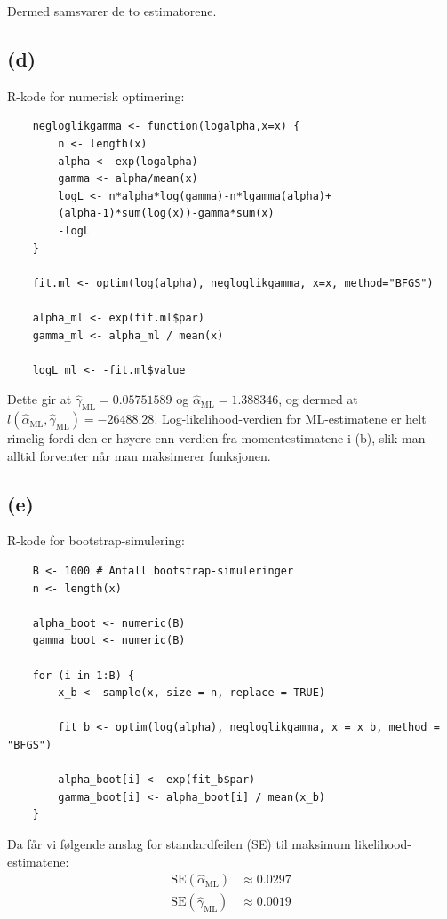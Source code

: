 \documentclass[11pt, a4paper]{article}
\begin{document}
Dermed samsvarer de to estimatorene.


\subsection*{(d)}
R-kode for numerisk optimering:
\vspace{0.5cm}
\begin{verbatim}
    negloglikgamma <- function(logalpha,x=x) {
        n <- length(x)
        alpha <- exp(logalpha)
        gamma <- alpha/mean(x)
        logL <- n*alpha*log(gamma)-n*lgamma(alpha)+
        (alpha-1)*sum(log(x))-gamma*sum(x)
        -logL
    }

    fit.ml <- optim(log(alpha), negloglikgamma, x=x, method="BFGS")

    alpha_ml <- exp(fit.ml$par)
    gamma_ml <- alpha_ml / mean(x)

    logL_ml <- -fit.ml$value
\end{verbatim}

Dette gir at $\hat{\gamma}_{\text{ML}} = 0.05751589$ og $\hat{\alpha}_{\text{ML}} = 1.388346$, og dermed at $l(\hat{\alpha}_{\text{ML}}, \hat{\gamma}_{\text{ML}}) = -26488.28$. Log-likelihood-verdien for ML-estimatene er helt rimelig fordi den er høyere enn verdien fra momentestimatene i (b), slik man alltid forventer når man maksimerer funksjonen.

\subsection*{(e)}
R-kode for bootstrap-simulering:
\begin{verbatim}
    B <- 1000 # Antall bootstrap-simuleringer
    n <- length(x)

    alpha_boot <- numeric(B)
    gamma_boot <- numeric(B)

    for (i in 1:B) {
        x_b <- sample(x, size = n, replace = TRUE)
        
        fit_b <- optim(log(alpha), negloglikgamma, x = x_b, method = "BFGS")
        
        alpha_boot[i] <- exp(fit_b$par)
        gamma_boot[i] <- alpha_boot[i] / mean(x_b)
    }
\end{verbatim}

Da får vi følgende anslag for standardfeilen (SE) til maksimum likelihood-estimatene:
\begin{align*}
    \text{SE}(\hat{\alpha}_{\text{ML}}) &\approx 0.0297 \\
    \text{SE}(\hat{\gamma}_{\text{ML}}) &\approx 0.0019
\end{align*}
\end{document}
